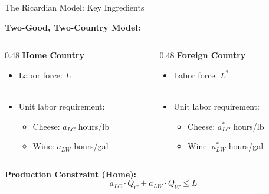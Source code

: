 \documentclass{beamer}
\begin{document}
\begin{frame}{The Ricardian Model: Key Ingredients}
\vspace{-0.5cm}

\textbf{Two-Good, Two-Country Model:}

\vspace{0.5cm}

\begin{columns}[T]
\begin{column}{0.48\textwidth}
\textbf{Home Country}
\vspace{0.25cm}
\begin{itemize}
    \item Labor force: $L$ \\~\\
    \item Unit labor requirement:
    \begin{itemize}
        \item Cheese: $a_{LC}$ hours/lb
        \item Wine: $a_{LW}$ hours/gal
    \end{itemize}
\end{itemize}
\end{column}

\begin{column}{0.48\textwidth}
\textbf{Foreign Country}
\vspace{0.25cm}
\begin{itemize}
    \item Labor force: $L^*$ \\~\\
    \item Unit labor requirement:
    \begin{itemize}
        \item Cheese: $a^*_{LC}$ hours/lb
        \item Wine: $a^*_{LW}$ hours/gal
    \end{itemize}
\end{itemize}
\end{column}
\end{columns}

\vspace{0.5cm}

\textbf{Production Constraint (Home):}
$$a_{LC} \cdot Q_C + a_{LW} \cdot Q_W \leq L$$

\end{frame}




\end{document}
